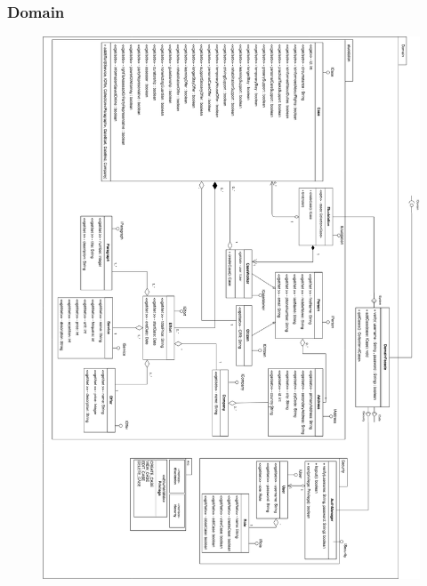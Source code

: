 \documentclass[../main.tex]{subfiles}
\begin{document}
  \subsubsection{Domain}
  \begin{figure}[H]
    \centering
    \includegraphics[scale=.30]{figurer/design-domain.png}
    \label{fig:design_domain}
  \end{figure}
  
\end{document}
